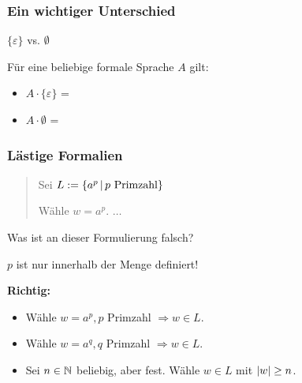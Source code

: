 \begin{frame}
	\frametitle{Ein wichtiger Unterschied}
	
	\begin{center}
		\huge{$\{\varepsilon\}$ vs. $\emptyset$}
	\end{center}
	
	Für eine beliebige formale Sprache $A$ gilt:
	
	\begin{itemize}
		\item $A \cdot \{\varepsilon\}$ = \only<2->{$A$}
		\item $A \cdot \emptyset$ = \only<3->{$\emptyset$}		
	\end{itemize}
\end{frame}

\begin{frame}
	\frametitle{Lästige Formalien}
	
	\begin{quote}
		Sei $L := \left\lbrace a^p \,\middle\vert\, p \text{ Primzahl} \right\rbrace$
		
		Wähle $w = a^p$. \hspace{0.5cm} $\dots$
	\end{quote}
	
	Was ist an dieser Formulierung falsch?
	
	\pause \ducttape{1cm}
	
	$p$ ist nur innerhalb der Menge definiert!
	
	\ducttape{0.5cm}
	
	\textbf{Richtig:}
	
	\begin{itemize}
		\item Wähle $w = a^p, p$ Primzahl $\Rightarrow w \in L$.
		\item Wähle $w = a^q, q$ Primzahl $\Rightarrow w \in L$.
		\item Sei $n \in \mathbb{N}$ beliebig, aber fest. Wähle $w \in L$ mit $\left\vert w \right\vert \geq n$.		
	\end{itemize}
\end{frame}


